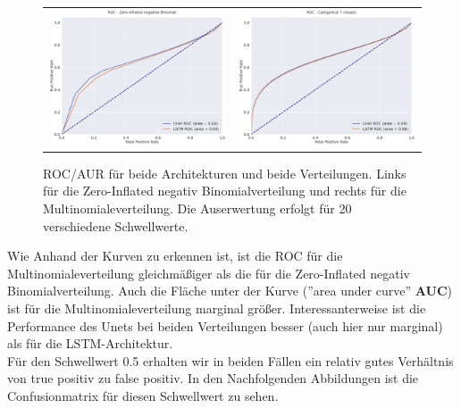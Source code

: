 \begin{figure}[h]
\begin{tabular}{cc}
\includegraphics[width=70mm]{abb/ROC_ZINFBINOM.png}&
\includegraphics[width=70mm]{abb/ROC_Categorical.png}
\end{tabular}
\caption{ROC/AUR für beide Architekturen und beide Verteilungen. Links für die Zero-Inflated negativ Binomialverteilung und rechts für die Multinomialeverteilung.
Die Auserwertung erfolgt für 20 verschiedene Schwellwerte. \label{fig:anomerz}}
\end{figure}

\noindent Wie Anhand der Kurven zu erkennen ist, ist die ROC für die Multinomialeverteilung gleichmäßiger als die für die Zero-Inflated negativ Binomialverteilung. 
Auch die Fläche unter der Kurve (''area under curve'' \textbf{AUC}) ist für die Multinomialeverteilung marginal größer. Interessanterweise ist die Performance des Unets bei beiden Verteilungen besser (auch hier nur marginal) als für die LSTM-Architektur.\\

\noindent Für den Schwellwert 0.5 erhalten wir in beiden Fällen ein relativ gutes Verhältnis von true positiv zu false positiv. In den Nachfolgenden Abbildungen ist die Confusionmatrix für diesen Schwellwert zu sehen.



